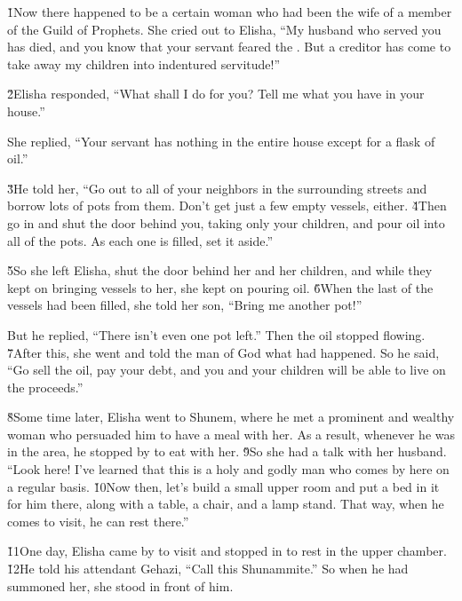 \v{1}Now there happened to be a certain woman who had been the wife of a member of the Guild of Prophets. She cried out to Elisha, ``My husband who served you has died, and you know that your servant feared the . But a creditor has come to take away my children into indentured servitude!''

\v{2}Elisha responded, ``What shall I do for you? Tell me what you have in your house.''

She replied, ``Your servant has nothing in the entire house except for a flask of oil.''

\v{3}He told her, ``Go out to all of your neighbors in the surrounding streets and borrow lots of pots from them. Don't get just a few empty vessels, either. \v{4}Then go in and shut the door behind you, taking only your children, and pour oil into all of the pots. As each one is filled, set it aside.''

\v{5}So she left Elisha, shut the door behind her and her children, and while they kept on bringing vessels to her, she kept on pouring oil. \v{6}When the last of the vessels had been filled, she told her son, ``Bring me another pot!''

But he replied, ``There isn't even one pot left.'' Then the oil stopped flowing. \v{7}After this, she went and told the man of God what had happened. So he said, ``Go sell the oil, pay your debt, and you and your children will be able to live on the proceeds.''

\v{8}Some time later, Elisha went to Shunem, where he met a prominent and wealthy woman who persuaded him to have a meal with her. As a result, whenever he was in the area, he stopped by to eat with her. \v{9}So she had a talk with her husband. ``Look here! I've learned that this is a holy and godly man who comes by here on a regular basis. \v{10}Now then, let's build a small upper room and put a bed in it for him there, along with a table, a chair, and a lamp stand. That way, when he comes to visit, he can rest there.''

\v{11}One day, Elisha came by to visit and stopped in to rest in the upper chamber. \v{12}He told his attendant Gehazi, ``Call this Shunammite.'' So when he had summoned her, she stood in front of him.

